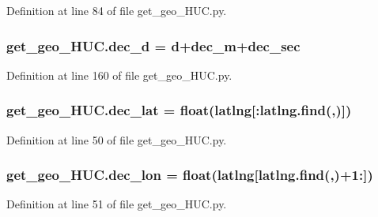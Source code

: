 Definition at line 84 of file get\+\_\+geo\+\_\+\+H\+U\+C.\+py.

\subsubsection[{\texorpdfstring{dec\+\_\+d}{dec_d}}]{\setlength{\rightskip}{0pt plus 5cm}get\+\_\+geo\+\_\+\+H\+U\+C.\+dec\+\_\+d = d+{\bf dec\+\_\+m}+{\bf dec\+\_\+sec}}\hypertarget{namespaceget__geo___h_u_c_a37be49575af3bb798889e4fcce1f79fe}{}\label{namespaceget__geo___h_u_c_a37be49575af3bb798889e4fcce1f79fe}


Definition at line 160 of file get\+\_\+geo\+\_\+\+H\+U\+C.\+py.

\subsubsection[{\texorpdfstring{dec\+\_\+lat}{dec_lat}}]{\setlength{\rightskip}{0pt plus 5cm}get\+\_\+geo\+\_\+\+H\+U\+C.\+dec\+\_\+lat = float({\bf latlng}\mbox{[}\+:latlng.\+find(\textquotesingle{},\textquotesingle{})\mbox{]})}\hypertarget{namespaceget__geo___h_u_c_a299ab467b6f9c8780c7b107ebf7681f3}{}\label{namespaceget__geo___h_u_c_a299ab467b6f9c8780c7b107ebf7681f3}


Definition at line 50 of file get\+\_\+geo\+\_\+\+H\+U\+C.\+py.

\subsubsection[{\texorpdfstring{dec\+\_\+lon}{dec_lon}}]{\setlength{\rightskip}{0pt plus 5cm}get\+\_\+geo\+\_\+\+H\+U\+C.\+dec\+\_\+lon = float({\bf latlng}\mbox{[}latlng.\+find(\textquotesingle{},\textquotesingle{})+1\+:\mbox{]})}\hypertarget{namespaceget__geo___h_u_c_afbfb5c7891caec4cd76fe21058d6e7ad}{}\label{namespaceget__geo___h_u_c_afbfb5c7891caec4cd76fe21058d6e7ad}


Definition at line 51 of file get\+\_\+geo\+\_\+\+H\+U\+C.\+py.

